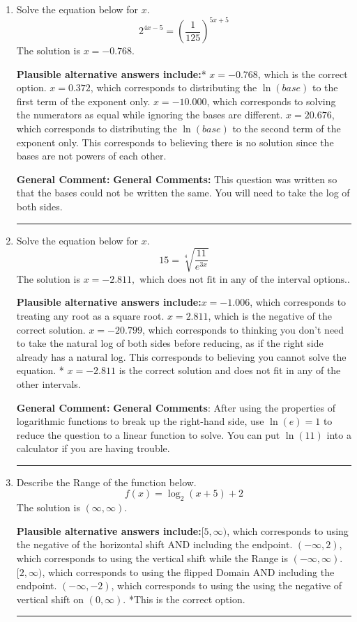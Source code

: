 \documentclass{extbook}[14pt]
\newcommand{\litem}[1]{\item #1

\rule{\textwidth}{0.4pt}}
\begin{document}
\begin{enumerate}\litem{
Solve the equation below for $x$.
\[ 2^{4x-5} = \left(\frac{1}{125}\right)^{5x+5} \]The solution is \( x = -0.768 \).\begin{enumerate}[label=\Alph*.]
\textbf{Plausible alternative answers include:}* $x = -0.768$, which is the correct option.
$x = 0.372$, which corresponds to distributing the $\ln(base)$ to the first term of the exponent only.
$x = -10.000$, which corresponds to solving the numerators as equal while ignoring the bases are different.
$x = 20.676$, which corresponds to distributing the $\ln(base)$ to the second term of the exponent only.
This corresponds to believing there is no solution since the bases are not powers of each other.
\end{enumerate}

\textbf{General Comment:} \textbf{General Comments:} This question was written so that the bases could not be written the same. You will need to take the log of both sides.
}
\litem{
Solve the equation below for $x$.
\[  15 = \sqrt[4]{\frac{11}{e^{3x}}} \]The solution is \( x = -2.811, \text{ which does not fit in any of the interval options.} \).\begin{enumerate}[label=\Alph*.]
\textbf{Plausible alternative answers include:}$x = -1.006$, which corresponds to treating any root as a square root.
$x = 2.811$, which is the negative of the correct solution.
$x = -20.799$, which corresponds to thinking you don't need to take the natural log of both sides before reducing, as if the right side already has a natural log.
This corresponds to believing you cannot solve the equation.
* $x = -2.811$ is the correct solution and does not fit in any of the other intervals.
\end{enumerate}

\textbf{General Comment:} \textbf{General Comments}: After using the properties of logarithmic functions to break up the right-hand side, use $\ln(e) = 1$ to reduce the question to a linear function to solve. You can put $\ln(11)$ into a calculator if you are having trouble.
}
\litem{
Describe the Range of the function below.
\[ f(x) = \log_2{(x+5)}+2 \]The solution is \( (\infty, \infty) \).\begin{enumerate}[label=\Alph*.]
\textbf{Plausible alternative answers include:}$[5, \infty)$, which corresponds to using the negative of the horizontal shift AND including the endpoint.
$(-\infty, 2)$, which corresponds to using the vertical shift while the Range is $(-\infty, \infty)$.
$[2, \infty)$, which corresponds to using the flipped Domain AND including the endpoint.
$(-\infty, -2)$, which corresponds to using the using the negative of vertical shift on $(0, \infty)$.
*This is the correct option.
\end{enumerate}

}
\end{enumerate}
\end{document}
